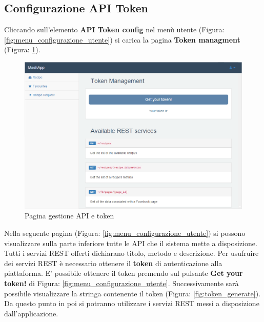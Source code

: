 	\pagebreak
	\subsection{Configurazione API Token} %
	\label{sec:settings_utente}
		Cliccando sull'elemento \textbf{API Token config} nel menù utente (Figura: \ref{fig:menu_configurazione_utente}) si carica la pagina \textbf{Token managment} (Figura: \ref{fig:token_config}).
		\begin{figure}[H]
			\centering
			\centerline{\includegraphics[width=14cm]{images/token_config.png}}
			\caption{Pagina gestione API e token}
			\label{fig:token_config}
		\end{figure}
		Nella seguente pagina (Figura: \ref{fig:menu_configurazione_utente}) si possono visualizzare sulla parte inferiore tutte le API che il sistema mette a disposizione. Tutti i servizi REST offerti dichiarano titolo, metodo e descrizione.\newline
		Per usufruire dei servizi REST è necessario ottenere il \textbf{token} di autenticazione alla piattaforma.\newline 
		E' possibile ottenere il token premendo sul pulsante \textbf{Get your token!} di Figura: \ref{fig:menu_configurazione_utente}.\newline
		Successivamente sarà possibile visualizzare la stringa contenente il token (Figura: \ref{fig:token_generate}). Da questo punto in poi si potranno utilizzare i servizi REST messi a disposizione dall'applicazione.
